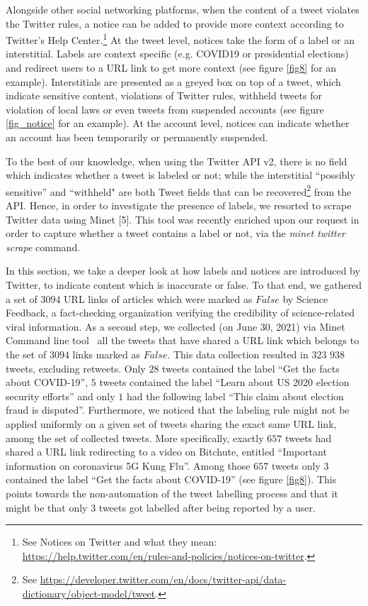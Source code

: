 \documentclass{article}
\begin{document}
Alongside other social networking platforms, when the content of a tweet violates the Twitter rules, a notice can be added to provide more context according to Twitter's Help Center.\footnote{See Notices on Twitter and what they mean: \href{https://help.twitter.com/en/rules-and-policies/notices-on-twitter}{https://help.twitter.com/en/rules-and-policies/notices-on-twitter}.} At the tweet level, notices take the form of a label or an interstitial. Labels are context specific (e.g. COVID19 or presidential elections) and  redirect users to a URL link to get more context (see figure \ref{fig8} for an example). Interstitials are presented as a greyed box on top of a tweet, which indicate sensitive content, violations of Twitter rules, withheld tweets for violation of local laws or even tweets from suspended accounts (see figure \ref{fig_notice} for an example). At the account level, notices can indicate whether an account has been temporarily or permanently suspended. 

\smallskip 

To the best of our knowledge, when using the Twitter API v2, there is no field which indicates whether a tweet is labeled or not; while the interstitial ``possibly sensitive'' and ``withheld" are both Tweet fields that can be recovered\footnote{See \href{https://developer.twitter.com/en/docs/twitter-api/data-dictionary/object-model/tweet}{https://developer.twitter.com/en/docs/twitter-api/data-dictionary/object-model/tweet}.} from the API. Hence, in order to investigate the presence of labels, we resorted to scrape Twitter data using Minet [5]. This tool was recently enriched upon our request in order to capture whether a tweet contains a label or not, via the {\it minet twitter scrape} command.

\smallskip

In this section, we take a deeper look at how labels and notices are introduced by Twitter, to indicate content which is inaccurate or false. To that end, we gathered a set of $3094$ URL links of articles which were marked as $False$ by Science Feedback, a fact-checking organization verifying the credibility of science-related viral information. As a second step, we collected (on June 30, 2021) via Minet Command line tool~\cite{minet} all the tweets that have shared a URL link which belongs to the set of $3094$ links marked as $False$. This data collection resulted in $323$ $938$ tweets, excluding retweets. Only $28$ tweets contained the label { ``Get the facts about COVID-19''}, $5$ tweets contained the label { ``Learn about US 2020 election security efforts''} and only $1$ had the following label {``This claim about election fraud is disputed''}. Furthermore, we noticed that the labeling rule might not be applied uniformly on a given set of tweets sharing the exact same URL link, among the set of collected tweets. More specifically, exactly $657$ tweets had shared a URL link redirecting to a video on Bitchute, entitled ``Important information on coronavirus 5G Kung Flu''. Among those $657$ tweets only $3$ contained the label ``Get the facts about COVID-19'' (see figure \ref{fig8}). This points towards the non-automation of the tweet labelling process and that it might be that only $3$ tweets got labelled after being reported by a user. 
\end{document}
